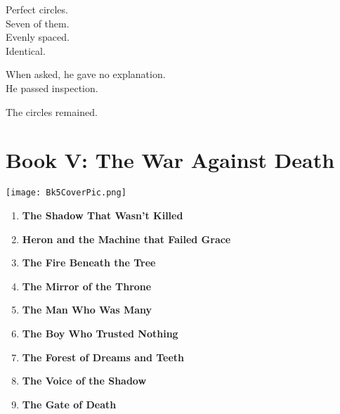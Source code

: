 \documentclass[12pt]{article}
\begin{document}
Perfect circles.\\
Seven of them.\\
Evenly spaced.\\
Identical.

When asked, he gave no explanation.\\
He passed inspection.

The circles remained.

\newpage

\section*{Book V: The War Against Death}

\vspace{1em}

\begin{center}
    \texttt{[image: Bk5CoverPic.png]}
\end{center}

\vspace{1em}

\begin{enumerate}
    \item \textbf{The Shadow That Wasn’t Killed} 

    \vspace{1pt}

    \item \textbf{Heron and the Machine that Failed Grace} 

    \vspace{1pt}

    \item \textbf{The Fire Beneath the Tree} 

    \vspace{1pt}

    \item \textbf{The Mirror of the Throne} 

    \vspace{1pt}

    \item \textbf{The Man Who Was Many} 

    \vspace{1pt}

    \item \textbf{The Boy Who Trusted Nothing}

    \vspace{1pt}

    \item \textbf{The Forest of Dreams and Teeth} 

    \vspace{1pt}

    \item \textbf{The Voice of the Shadow}

    \vspace{1pt}

    \item \textbf{The Gate of Death}

\end{enumerate}
\end{document}
